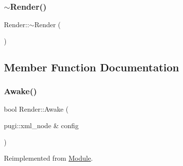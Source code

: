 \mbox{\label{class_render_ab0f4b917605cb15902f8d045a4197faf}} 
\subsubsection{\texorpdfstring{$\sim$Render()}{~Render()}}
{\footnotesize\ttfamily Render\+::$\sim$\+Render (\begin{DoxyParamCaption}{ }\end{DoxyParamCaption})\hspace{0.3cm}{\ttfamily [virtual]}}



\subsection{Member Function Documentation}
\mbox{\label{class_render_a8a61f512aafe184f4d322433e5f695a4}} 
\subsubsection{\texorpdfstring{Awake()}{Awake()}}
{\footnotesize\ttfamily bool Render\+::\+Awake (\begin{DoxyParamCaption}\item[{pugi\+::xml\+\_\+node \&}]{config }\end{DoxyParamCaption})\hspace{0.3cm}{\ttfamily [virtual]}}



Reimplemented from \mbox{\hyperlink{class_module_a4a283650cf8a73aa0b5599106bc2ba6c}{Module}}.

\mbox{\label{class_render_acc05d0aa22b4bcb2dcedf5e435dbb430}} 
